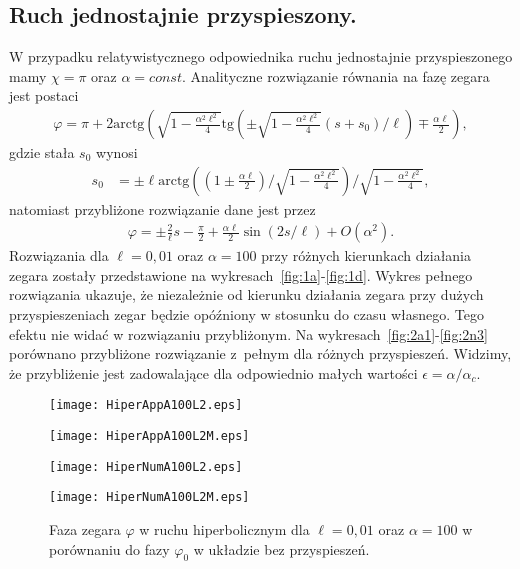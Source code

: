 \newpage
\subsection{Ruch jednostajnie przyspieszony.}
W przypadku relatywistycznego odpowiednika ruchu jednostajnie 
przyspieszonego mamy $\chi = \pi$ oraz $\alpha = const$.
Analityczne rozwiązanie 
równania na fazę zegara jest postaci
\begin{align*}
\varphi = \pi + 
2\text{arctg} \left( 
\sqrt{1-\frac{\alpha^2\ell^2}{4}} 
\text{tg} \left( \pm 
\sqrt{1-\frac{\alpha^2\ell^2}{4}} 
(s + s_0)/\ell\right)  \mp \frac{\alpha \ell}{2}
\right),
\end{align*}
gdzie stała $s_0$ wynosi
\begin{align*}
s_0 & = \pm \ell \text{arctg}  
\left( \left(1 \pm\frac{\alpha\ell}{2}\right) \Big / 
\sqrt{1-\frac{\alpha^2\ell^2}{4}}  \right)
\Big /\sqrt{1-\frac{\alpha^2\ell^2}{4}} ,
\end{align*}
natomiast przybliżone rozwiązanie dane jest przez
\begin{align*}
\varphi =  \pm \frac{2}{\ell}s - \frac{\pi}{2} 
+ \frac{\alpha \ell}{2}  \sin (2 s / \ell  )  
+O(\alpha^2).
\end{align*}
Rozwiązania dla $\ell=0,01$ oraz $\alpha=100$ przy różnych 
kierunkach działania zegara 
zostały przedstawione na wykresach~\ref{fig:1a}-\ref{fig:1d}.
Wykres pełnego rozwiązania ukazuje, 
że niezależnie od kierunku działania zegara przy dużych 
przyspieszeniach zegar będzie opóźniony w stosunku do
czasu własnego. Tego efektu nie widać w rozwiązaniu przybliżonym.
Na wykresach~\ref{fig:2a1}-\ref{fig:2n3} porównano przybliżone rozwiązanie
 z~pełnym dla różnych przyspieszeń. 
Widzimy, że przybliżenie jest zadowalające dla odpowiednio małych 
wartości $\epsilon = \alpha / \alpha_c$.
\begin{figure}[h]
\begin{minipage}[b]{.5\linewidth}
\centering
\texttt{[image: HiperAppA100L2.eps]}
\label{fig:1a}
\end{minipage}%
\begin{minipage}[b]{.5\linewidth}
\centering
\texttt{[image: HiperAppA100L2M.eps]}
\label{fig:1b}
\end{minipage}
\begin{minipage}[b]{.5\linewidth}
\centering
\texttt{[image: HiperNumA100L2.eps]}
\label{fig:1c}
\end{minipage}%
\begin{minipage}[b]{.5\linewidth}
\centering
\texttt{[image: HiperNumA100L2M.eps]}
\label{fig:1d}
\end{minipage}
\caption{Faza zegara $\varphi$ w ruchu hiperbolicznym dla 
$\ell=0,01$ oraz $\alpha=100$ w porównaniu do fazy 
$\varphi_0$ w układzie bez przyspieszeń. }\label{fig:1}
\end{figure}
